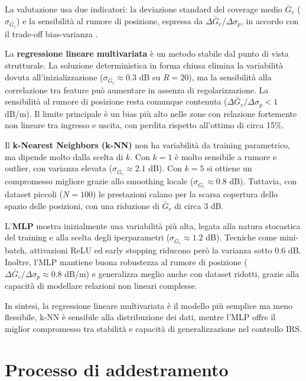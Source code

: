 \documentclass[12pt,a4paper]{report}
\begin{document}
La valutazione usa due indicatori: la deviazione standard del coverage
medio $\bar{G}_c$ ($\sigma_{\bar{G}_c}$) e la sensibilità al rumore di
posizione, espressa da $\Delta \bar{G}_c / \Delta \sigma_p$, in accordo
con il trade-off bias-varianza \cite{hastie2009esl}.

La \textbf{regressione lineare multivariata} è un metodo stabile dal
punto di vista strutturale. La soluzione deterministica in forma chiusa
elimina la variabilità dovuta all'inizializzazione
($\sigma_{\bar{G}_c} \approx 0.3$ dB su $R=20$), ma la sensibilità alla
correlazione tra feature può aumentare in assenza di regolarizzazione.
La sensibilità al rumore di posizione resta comunque contenuta
($\Delta \bar{G}_c / \Delta \sigma_p < 1$ dB/m). Il limite principale è
un bias più alto nelle zone con relazione fortemente non lineare tra
ingresso e uscita, con perdita rispetto all'ottimo di circa 15\%.

Il \textbf{k-Nearest Neighbors (k-NN)} non ha variabilità da training
parametrico, ma dipende molto dalla scelta di $k$. Con $k=1$ è molto
sensibile a rumore e outlier, con varianza elevata
($\sigma_{\bar{G}_c} \approx 2.1$ dB). Con $k=5$ si ottiene un
compromesso migliore grazie allo smoothing locale
($\sigma_{\bar{G}_c} \approx 0.8$ dB). Tuttavia, con dataset piccoli
($N=100$) le prestazioni calano per la scarsa copertura dello spazio
delle posizioni, con una riduzione di $\bar{G}_c$ di circa 3 dB.

L'\textbf{MLP} mostra inizialmente una variabilità più alta, legata alla
natura stocastica del training e alla scelta degli iperparametri
($\sigma_{\bar{G}_c} \approx 1.2$ dB). Tecniche come mini-batch,
attivazioni ReLU ed early stopping riducono però la varianza sotto
$0.6$ dB. Inoltre, l'MLP mantiene buona robustezza al rumore di
posizione ($\Delta \bar{G}_c / \Delta \sigma_p \approx 0.8$ dB/m) e
generalizza meglio anche con dataset ridotti, grazie alla capacità di
modellare relazioni non lineari complesse.

In sintesi, la regressione lineare multivariata è il modello più
semplice ma meno flessibile, k-NN è sensibile alla distribuzione dei
dati, mentre l'MLP offre
il miglior compromesso tra stabilità e capacità di generalizzazione nel
controllo IRS.

\chapter{Processo di addestramento}
\label{chap:addestramento}
\end{document}
